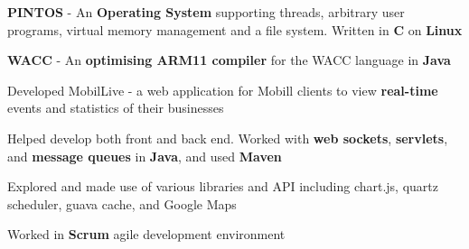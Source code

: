 \documentclass[a4paper]{deedy-resume-openfont}
\begin{document}
\begin{minipage}[t]{0.63\textwidth}
\vskip 0.2cm

\begin{tightemize}
\item {\small \textbf{PINTOS} - An \textbf{Operating System} supporting threads, arbitrary user programs, virtual memory management and a file system. Written in \textbf{C} on \textbf{Linux}}  
\item {\small \textbf{WACC} - An \textbf{optimising ARM11 compiler} for the WACC language in \textbf{Java}  }
\end{tightemize}
\sectionsep



\vskip 0.2cm

Developed MobilLive - a web application for Mobill clients to view \textbf{real-time} events and statistics of their businesses
\begin{tightemize} 
\item {\small Helped develop both front and back end. Worked with \textbf{web sockets}, \textbf{servlets}, and \textbf{message queues} in \textbf{Java}, and used \textbf{Maven} }
\item {\small Explored and made use of various libraries and API including chart.js, quartz scheduler, guava cache, and Google Maps}
\item {\small Worked in \textbf{Scrum} agile development environment}
\end{tightemize}
\sectionsep


\end{minipage}
\end{document}
